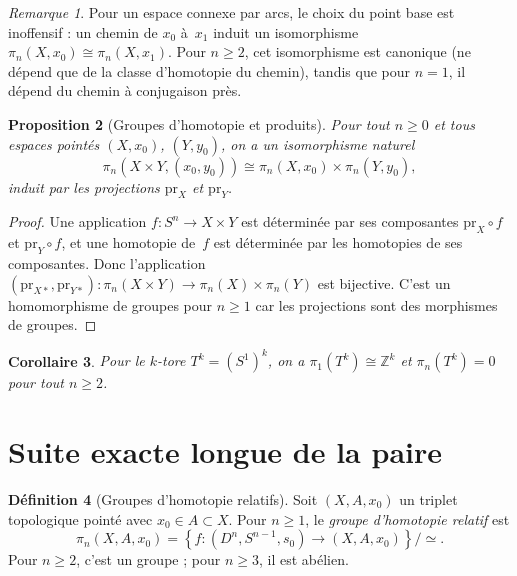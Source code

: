 \documentclass[12pt,a4paper,openany]{book}
\theoremstyle{definition}
\newtheorem{definition}{Définition}[chapter]
\theoremstyle{plain}
\newtheorem{proposition}[definition]{Proposition}
\newtheorem{corollaire}[definition]{Corollaire}
\theoremstyle{remark}
\newtheorem{remarque}[definition]{Remarque}
\newcommand{\Z}{\mathbb{Z}}
\newcommand{\set}[1]{\left\{#1\right\}}
\begin{document}
\begin{remarque}\label{rem:pi-n-changement-base}
  Pour un espace connexe par arcs, le choix du point base est inoffensif : un chemin
  de $x_0$ à~$x_1$ induit un isomorphisme
  $\pi_n(X, x_0) \cong \pi_n(X, x_1)$. Pour $n \geq 2$, cet isomorphisme est
  canonique (ne dépend que de la classe d'homotopie du chemin), tandis que pour
  $n = 1$, il dépend du chemin à conjugaison près.
\end{remarque}

\begin{proposition}[Groupes d'homotopie et produits]\label{prop:pi-produit}
  Pour tout $n \geq 0$ et tous espaces pointés $(X, x_0)$, $(Y, y_0)$, on a
  un isomorphisme naturel
  \[
    \pi_n(X \times Y, (x_0, y_0)) \cong \pi_n(X, x_0) \times \pi_n(Y, y_0),
  \]
  induit par les projections $\mathrm{pr}_X$ et $\mathrm{pr}_Y$.
\end{proposition}

\begin{proof}
  Une application $f \colon S^n \to X \times Y$ est déterminée par ses composantes
  $\mathrm{pr}_X \circ f$ et $\mathrm{pr}_Y \circ f$, et une homotopie de~$f$
  est déterminée par les homotopies de ses composantes. Donc l'application
  $(\mathrm{pr}_{X*}, \mathrm{pr}_{Y*}) \colon \pi_n(X \times Y) \to
  \pi_n(X) \times \pi_n(Y)$ est bijective. C'est un homomorphisme de groupes
  pour $n \geq 1$ car les projections sont des morphismes de groupes.
\end{proof}

\begin{corollaire}\label{cor:pi-tore}
  Pour le $k$-tore $T^k = (S^1)^k$, on a
  $\pi_1(T^k) \cong \Z^k$ et $\pi_n(T^k) = 0$ pour tout $n \geq 2$.
\end{corollaire}

\section{Suite exacte longue de la paire}\label{sec:suite-exacte-paire-homotopie}

\begin{definition}[Groupes d'homotopie relatifs]\label{def:pi-n-relatif}
  Soit $(X, A, x_0)$ un triplet topologique pointé avec $x_0 \in A \subset X$.
  Pour $n \geq 1$, le \emph{groupe d'homotopie relatif} est
  \[
    \pi_n(X, A, x_0) = \set{f \colon (D^n, S^{n-1}, s_0) \to (X, A, x_0)} / {\simeq}.
  \]
  Pour $n \geq 2$, c'est un groupe ; pour $n \geq 3$, il est abélien.
\end{definition}
\end{document}
